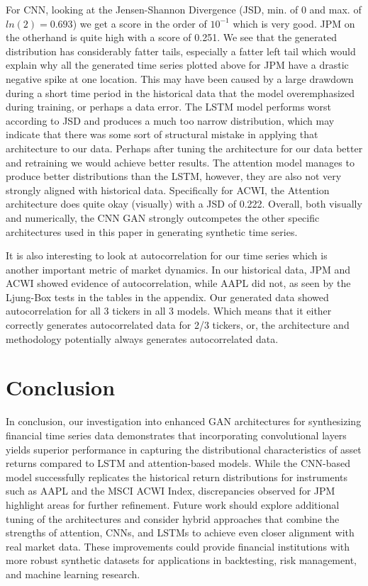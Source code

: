 \documentclass{article}
\begin{document}
For CNN, looking at the Jensen-Shannon Divergence (JSD, min. of 0 and max. of $ ln(2) = 0.693 $) we get a score in the order of $ 10^{-1} $ which is very good. JPM on the otherhand is quite high with a score of 0.251. We see that the generated distribution has considerably fatter tails, especially a fatter left tail which would explain why all the generated time series plotted above for JPM have a drastic negative spike at one location. This may have been caused by a large drawdown during a short time period in the historical data that the model overemphasized during training, or perhaps a data error. The LSTM model performs worst according to JSD and produces a much too narrow distribution, which may indicate that there was some sort of structural mistake in applying that architecture to our data. Perhaps after tuning the architecture for our data better and retraining we would achieve better results. The attention model manages to produce better distributions than the LSTM, however, they are also not very strongly aligned with historical data. Specifically for ACWI, the Attention architecture does quite okay (visually) with a JSD of 0.222. Overall, both visually and numerically, the CNN GAN strongly outcompetes the other specific architectures used in this paper in generating synthetic time series.

It is also interesting to look at autocorrelation for our time series which is another important metric of market dynamics. In our historical data, JPM and ACWI showed evidence of autocorrelation, while AAPL did not, as seen by the Ljung-Box tests in the tables in the appendix. Our generated data showed autocorrelation for all 3 tickers in all 3 models. Which means that it either correctly generates autocorrelated data for 2/3 tickers, or, the architecture and methodology potentially always generates autocorrelated data.

\section{Conclusion}

In conclusion, our investigation into enhanced GAN architectures for synthesizing financial time series data demonstrates that incorporating convolutional layers yields superior performance in capturing the distributional characteristics of asset returns compared to LSTM and attention-based models. While the CNN-based model successfully replicates the historical return distributions for instruments such as AAPL and the MSCI ACWI Index, discrepancies observed for JPM highlight areas for further refinement. Future work should explore additional tuning of the architectures and consider hybrid approaches that combine the strengths of attention, CNNs, and LSTMs to achieve even closer alignment with real market data. These improvements could provide financial institutions with more robust synthetic datasets for applications in backtesting, risk management, and machine learning research.
\end{document}
